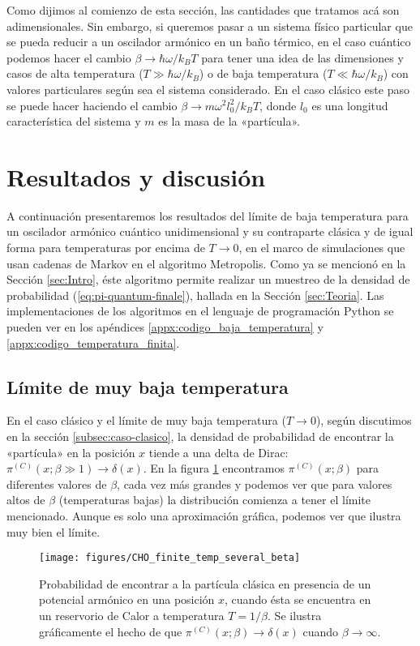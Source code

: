 \documentclass[%
 reprint,
 amsmath,amssymb,
 aps,
 pra,
]{revtex4-2}
\begin{document}
Como dijimos al comienzo de esta sección, las cantidades que tratamos acá son adimensionales. Sin embargo, si queremos pasar a un sistema físico particular que se pueda reducir a un oscilador armónico en un baño térmico, en el caso cuántico podemos hacer el cambio $\beta\rightarrow\hbar\omega / k_B T$ para tener una idea de las dimensiones y casos de alta temperatura  ($T \gg \hbar\omega / k_B$) o de baja temperatura ($T \ll \hbar\omega / k_B$) con valores particulares según sea el sistema considerado. En el caso clásico este paso se puede hacer haciendo el cambio $\beta \rightarrow m\omega^2l_0^2/k_B T$, donde $l_0$ es una longitud característica del sistema y $m$ es la masa de la «partícula».


\section{\label{sec:Resultados}Resultados y discusión}
A continuación presentaremos los resultados del límite de baja temperatura para un oscilador armónico cuántico unidimensional y su contraparte clásica y de igual forma para temperaturas por encima de $T \rightarrow 0$, en el marco de simulaciones que usan cadenas de Markov en el algoritmo Metropolis. Como ya se mencionó en la Sección \ref{sec:Intro}, éste algoritmo permite realizar un muestreo de la densidad de probabilidad (\ref{eq:pi-quantum-finale}), hallada en la Sección \ref{sec:Teoria}. Las implementaciones de los algoritmos en el lenguaje de programación Python se pueden ver en los apéndices \ref{appx:codigo_baja_temperatura} y \ref{appx:codigo_temperatura_finita}.

\subsection{Límite de muy baja temperatura}

En el caso clásico y el límite de muy baja temperatura ($T \rightarrow 0 $), según discutimos en la sección \ref{subsec:caso-clasico}, la densidad de probabilidad de encontrar la «partícula» en la posición $x$ tiende a una delta de Dirac: $\pi^{(C)}(x;\beta \gg 1) \rightarrow \delta(x)$. En la figura \ref{fig:classic_probability} encontramos $\pi^{(C)}(x;\beta)$ para diferentes valores de $\beta$, cada vez más grandes y podemos ver que para valores altos de $\beta$ (temperaturas bajas) la distribución comienza a tener el límite mencionado. Aunque es solo una aproximación gráfica, podemos ver que ilustra muy bien el límite.
\begin{figure}[!t]
	\centering
	\texttt{[image: figures/CHO\_finite\_temp\_several\_beta]}
	\caption{Probabilidad de encontrar a la partícula clásica en presencia de un potencial armónico en una posición $x$, cuando ésta se encuentra en un reservorio de Calor a temperatura $T=1/\beta$. Se ilustra gráficamente el hecho de que $\pi^{(C)}(x;\beta) \rightarrow \delta(x)$ cuando $\beta\rightarrow\infty$.}
	\label{fig:classic_probability}
\end{figure}
\end{document}
